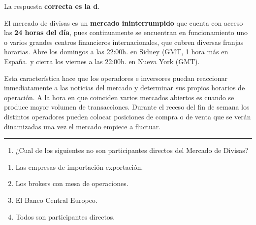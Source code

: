 \documentclass[
  letterpaper,
  DIV=11,
  numbers=noendperiod]{scrreprt}
\providecommand{\tightlist}{%
  \setlength{\itemsep}{0pt}\setlength{\parskip}{0pt}}\usepackage{longtable,booktabs,array}
\begin{document}
\begin{tcolorbox}[enhanced jigsaw, left=2mm, opacityback=0, colback=white, breakable, arc=.35mm, bottomrule=.15mm, rightrule=.15mm, toprule=.15mm, leftrule=.75mm, colframe=quarto-callout-tip-color-frame]
\begin{minipage}[t]{5.5mm}
\textcolor{quarto-callout-tip-color}{\faLightbulb}
\end{minipage}%
\begin{minipage}[t]{\textwidth - 5.5mm}

La respuesta \textbf{correcta es la d}.

El mercado de divisas es un \textbf{mercado ininterrumpido} que cuenta
con acceso las \textbf{24 horas del día}, pues continuamente se
encuentran en funcionamiento uno o varios grandes centros financieros
internacionales, que cubren diversas franjas horarias. Abre los domingos
a las 22:00h. en Sidney (GMT, 1 hora más en España. y cierra los viernes
a las 22:00h. en Nueva York (GMT).

Esta característica hace que los operadores e inversores puedan
reaccionar inmediatamente a las noticias del mercado y determinar sus
propios horarios de operación. A la hora en que coinciden varios
mercados abiertos es cuando se produce mayor volumen de transacciones.
Durante el receso del fin de semana los distintos operadores pueden
colocar posiciones de compra o de venta que se verán dinamizadas una vez
el mercado empiece a fluctuar.

\end{minipage}%
\end{tcolorbox}

\begin{center}\rule{0.5\linewidth}{0.5pt}\end{center}

\begin{enumerate}
\def\labelenumi{\arabic{enumi}.}
\setcounter{enumi}{36}
\tightlist
\item
  ¿Cual de los siguientes no son participantes directos del Mercado de
  Divisas?
\end{enumerate}

\begin{enumerate}
\def\labelenumi{\alph{enumi}.}
\item
  Las empresas de importación-exportación.
\item
  Los brokers con mesa de operaciones.
\item
  El Banco Central Europeo.
\item
  Todos son participantes directos.
\end{enumerate}
\end{document}
